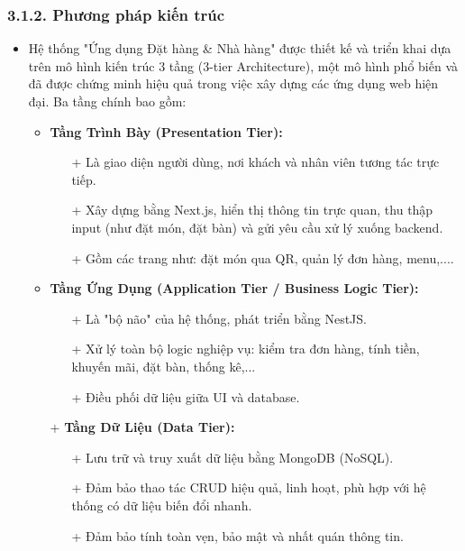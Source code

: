 \documentclass[a4paper]{article}
\begin{document}
\subsubsection{3.1.2. Phương pháp kiến trúc}
\begin{itemize}
    \item Hệ thống "Ứng dụng Đặt hàng \& Nhà hàng" được thiết kế và triển khai dựa trên mô hình kiến trúc 3 tầng (3-tier Architecture), một mô hình phổ biến và đã được chứng minh hiệu quả trong việc xây dựng các ứng dụng web hiện đại. Ba tầng chính bao gồm:
    \begin{itemize}
    \item \textbf{Tầng Trình Bày (Presentation Tier):} 
    \begin{itemize}
        \item [+]Là giao diện người dùng, nơi khách và nhân viên tương tác trực tiếp.
        \item [+] Xây dựng bằng Next.js, hiển thị thông tin trực quan, thu thập input (như đặt món, đặt bàn) và gửi yêu cầu xử lý xuống backend.
        \item [+] Gồm các trang như: đặt món qua QR, quản lý đơn hàng, menu,....
    \end{itemize}

    \item \textbf{Tầng Ứng Dụng (Application Tier / Business Logic Tier):} 
    \begin{itemize}
        \item [+] Là "bộ não" của hệ thống, phát triển bằng NestJS.
        \item [+] Xử lý toàn bộ logic nghiệp vụ: kiểm tra đơn hàng, tính tiền, khuyến mãi, đặt bàn, thống kê,...
        \item [+] Điều phối dữ liệu giữa UI và database.
    \end{itemize}

    \item [+] \textbf{Tầng Dữ Liệu (Data Tier):} 
    \begin{itemize}
        \item [+]Lưu trữ và truy xuất dữ liệu bằng MongoDB (NoSQL).
        \item [+]Đảm bảo thao tác CRUD hiệu quả, linh hoạt, phù hợp với hệ thống có dữ liệu biến đổi nhanh.
        \item [+]Đảm bảo tính toàn vẹn, bảo mật và nhất quán thông tin.
    \end{itemize}
\end{itemize}
\end{itemize}
\end{document}
